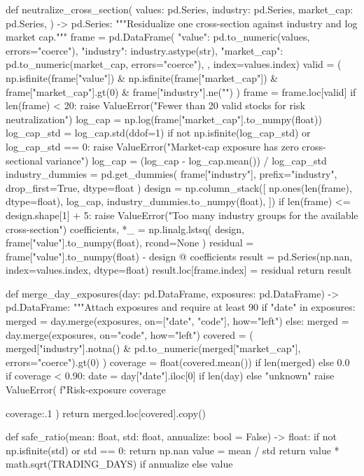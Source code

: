 \documentclass[UTF8,a4paper,fontset=fandol]{ctexart}
\begin{document}
\begin{ProjectCode}
def neutralize_cross_section(
    values: pd.Series,
    industry: pd.Series,
    market_cap: pd.Series,
) -> pd.Series:
    """Residualize one cross-section against industry and log market cap."""
    frame = pd.DataFrame({
        "value": pd.to_numeric(values, errors="coerce"),
        "industry": industry.astype(str),
        "market_cap": pd.to_numeric(market_cap, errors="coerce"),
    }, index=values.index)
    valid = (
        np.isfinite(frame["value"])
        & np.isfinite(frame["market_cap"])
        & frame["market_cap"].gt(0)
        & frame["industry"].ne("")
    )
    frame = frame.loc[valid]
    if len(frame) < 20:
        raise ValueError("Fewer than 20 valid stocks for risk neutralization")
    log_cap = np.log(frame["market_cap"].to_numpy(float))
    log_cap_std = log_cap.std(ddof=1)
    if not np.isfinite(log_cap_std) or log_cap_std == 0:
        raise ValueError("Market-cap exposure has zero cross-sectional variance")
    log_cap = (log_cap - log_cap.mean()) / log_cap_std
    industry_dummies = pd.get_dummies(
        frame["industry"], prefix="industry", drop_first=True, dtype=float
    )
    design = np.column_stack([
        np.ones(len(frame), dtype=float),
        log_cap,
        industry_dummies.to_numpy(float),
    ])
    if len(frame) <= design.shape[1] + 5:
        raise ValueError("Too many industry groups for the available cross-section")
    coefficients, *_ = np.linalg.lstsq(
        design, frame["value"].to_numpy(float), rcond=None
    )
    residual = frame["value"].to_numpy(float) - design @ coefficients
    result = pd.Series(np.nan, index=values.index, dtype=float)
    result.loc[frame.index] = residual
    return result


def merge_day_exposures(day: pd.DataFrame, exposures: pd.DataFrame) -> pd.DataFrame:
    """Attach exposures and require at least 90%
    if "date" in exposures:
        merged = day.merge(exposures, on=["date", "code"], how="left")
    else:
        merged = day.merge(exposures, on="code", how="left")
    covered = (
        merged["industry"].notna()
        & pd.to_numeric(merged["market_cap"], errors="coerce").gt(0)
    )
    coverage = float(covered.mean()) if len(merged) else 0.0
    if coverage < 0.90:
        date = day["date"].iloc[0] if len(day) else "unknown"
        raise ValueError(
            f"Risk-exposure coverage {coverage:.1%
        )
    return merged.loc[covered].copy()


def safe_ratio(mean: float, std: float, annualize: bool = False) -> float:
    if not np.isfinite(std) or std == 0:
        return np.nan
    value = mean / std
    return value * math.sqrt(TRADING_DAYS) if annualize else value


}
\end{ProjectCode}
\end{document}
